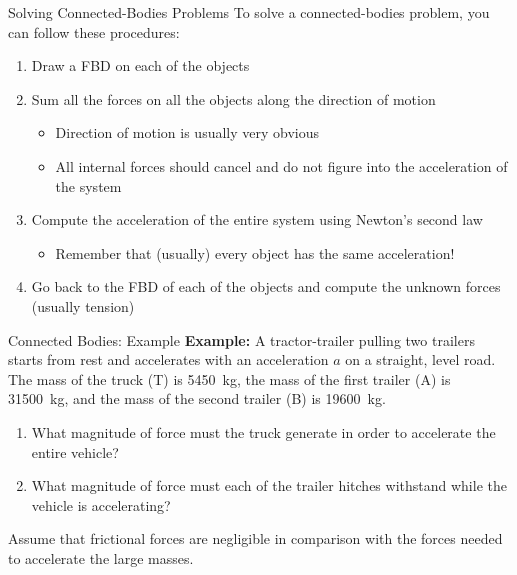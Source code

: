 \documentclass[12pt,compress,aspectratio=169]{beamer}
\begin{document}
\begin{frame}{Solving Connected-Bodies Problems}
  To solve a connected-bodies problem, you can follow these procedures:
  \begin{enumerate}
  \item Draw a FBD on each of the objects
  \item Sum all the forces on all the objects along the direction of motion
    \begin{itemize}
    \item Direction of motion is usually very obvious
    \item All internal forces should cancel and do not figure into the
      acceleration of the system
    \end{itemize}
  \item Compute the acceleration of the entire system using Newton's second law
    \begin{itemize}
    \item Remember that (usually) every object has the same acceleration!
    \end{itemize}
  \item Go back to the FBD of each of the objects and compute the unknown
    forces (usually tension)
  \end{enumerate}
\end{frame}



\begin{frame}{Connected Bodies: Example}
  \textbf{Example:} A tractor-trailer pulling two trailers starts from rest
  and accelerates with an acceleration $a$ on a straight, level road.
  The mass of the truck (T) is \SI{5450}{kg}, the
  mass of the first trailer (A) is \SI{31500}{kg}, and the mass of the second
  trailer (B) is \SI{19600}{kg}.
  \begin{enumerate}
  \item What magnitude of force must the truck generate in order to accelerate
    the entire vehicle?
  \item What magnitude of force must each of the trailer hitches withstand
    while the vehicle is accelerating?
  \end{enumerate}
  Assume that frictional forces are negligible in comparison with the forces
  needed to accelerate the large masses.
\end{frame}
\end{document}
